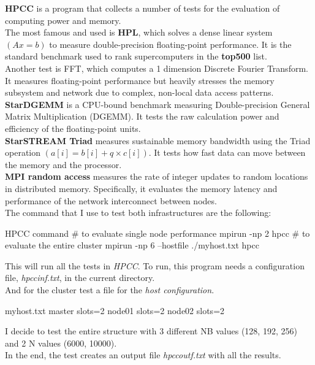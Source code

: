 \textbf{HPCC} is a program that collects a number of tests for the evaluation of computing power and memory. \\
The most famous and used is \textbf{HPL}, which solves a dense linear system $(Ax=b)$ to measure double-precision floating-point performance. It is the standard benchmark used to rank supercomputers in the \textbf{top500} list. \\
Another test is FFT, which computes a 1 dimension Discrete Fourier Transform. It measures floating-point performance but heavily stresses the memory subsystem and network due to complex, non-local data access patterns. \\
\textbf{StarDGEMM} is a CPU-bound benchmark measuring Double-precision General Matrix Multiplication (DGEMM). It tests the raw calculation power and efficiency of the floating-point units. \\
\textbf{StarSTREAM Triad} measures sustainable memory bandwidth using the Triad operation $(a[i]=b[i]+q \times c[i])$. It tests how fast data can move between the memory and the processor. \\
\textbf{MPI random access} measures the rate of integer updates to random locations in distributed memory. Specifically, it evaluates the memory latency and performance of the network interconnect between nodes. \\
The command that I use to test both infrastructures are the following:

\begin{codice}[style=bashstyle]{HPCC command}
    # to evaluate single node performance
    mpirun -np 2 hpcc
    # to evaluate the entire cluster
    mpirun -np 6 --hostfile ./myhost.txt hpcc
\end{codice}

This will run all the tests in \textit{HPCC}. To run, this program needs a configuration file, \textit{hpccinf.txt}, in the current directory. \\
And for the cluster test a file for the \textit{host configuration}.

\begin{codice}[]{myhost.txt}
    master slots=2
    node01 slots=2
    node02 slots=2
\end{codice}

I decide to test the entire structure with 3 different NB values (128, 192, 256) and 2 N values (6000, 10000). \\
In the end, the test creates an output file \textit{hpccoutf.txt} with all the results.

